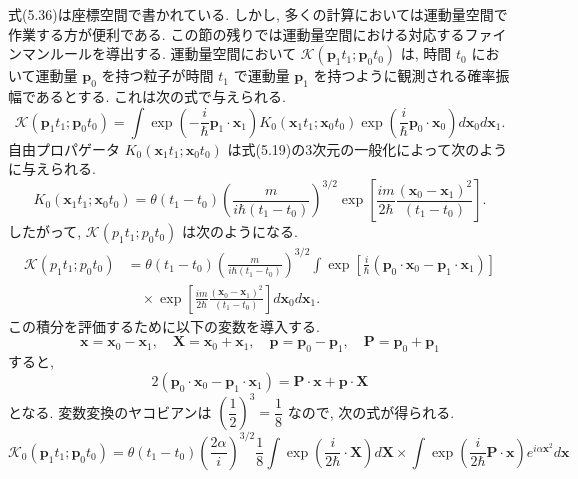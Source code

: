 \documentclass[a4paper,12pt]{article}
\begin{document}
    式(5.36)は座標空間で書かれている. しかし, 多くの計算においては運動量空間で作業する方が便利である. この節の残りでは運動量空間における対応するファインマンルールを導出する. 運動量空間において $\mathcal{K}(\mathbf{p}_1 t_1; \mathbf{p}_0 t_0)$ は, 時間 $t_0$ において運動量 $\mathbf{p}_0$ を持つ粒子が時間 $t_1$ で運動量 $\mathbf{p}_1$ を持つように観測される確率振幅であるとする. これは次の式で与えられる.
\begin{equation*}
        \mathcal{K}(\mathbf{p}_1 t_1; \mathbf{p}_0 t_0) = \int \exp \left( -\frac{i}{\hbar} \mathbf{p}_1 \cdot \mathbf{x}_1 \right) K_0(\mathbf{x}_1 t_1; \mathbf{x}_0 t_0) \exp \left( \frac{i}{\hbar} \mathbf{p}_0 \cdot \mathbf{x}_0 \right) d\mathbf{x}_0 d\mathbf{x}_1. \tag{5.38}
\end{equation*}
自由プロパゲータ $K_0(\mathbf{x}_1 t_1; \mathbf{x}_0 t_0)$ は式(5.19)の3次元の一般化によって次のように与えられる.
\begin{equation*}
    K_0(\mathbf{x}_1 t_1; \mathbf{x}_0 t_0) = \theta(t_1 - t_0) \left( \frac{m}{i\hbar(t_1 - t_0)} \right)^{3/2} \exp \left[ \frac{im}{2\hbar} \frac{(\mathbf{x}_0 - \mathbf{x}_1)^2}{(t_1 - t_0)} \right]. \tag{5.39}
\end{equation*}
したがって, $\mathcal{K}(p_1 t_1; p_0 t_0)$ は次のようになる.
\begin{align*}
    \mathcal{K}(p_1 t_1; p_0 t_0) &= \theta(t_1 - t_0) \left( \frac{m}{i\hbar(t_1 - t_0)} \right)^{3/2} \int \exp\left[ \frac{i}{\hbar}(\mathbf{p}_0 \cdot \mathbf{x}_0 - \mathbf{p}_1 \cdot \mathbf{x}_1) \right]\\
    &\quad \times \exp\left[ \frac{im}{2\hbar} \frac{(\mathbf{x}_0 - \mathbf{x}_1)^2}{(t_1 - t_0)} \right]d\mathbf{x}_0 d\mathbf{x}_1.
\end{align*}
この積分を評価するために以下の変数を導入する.
\begin{equation*}
    \mathbf{x} = \mathbf{x}_0 - \mathbf{x}_1, \quad \mathbf{X} = \mathbf{x}_0 + \mathbf{x}_1, \quad \mathbf{p} = \mathbf{p}_0 - \mathbf{p}_1, \quad \mathbf{P} = \mathbf{p}_0 + \mathbf{p}_1
\end{equation*}
すると, 
\begin{equation*}
    2(\mathbf{p}_0 \cdot \mathbf{x}_0 - \mathbf{p}_1 \cdot \mathbf{x}_1) = \mathbf{P} \cdot \mathbf{x} + \mathbf{p} \cdot \mathbf{X}
\end{equation*}
となる. 変数変換のヤコビアンは $\left( \dfrac{1}{2} \right)^3 = \dfrac{1}{8}$ なので, 次の式が得られる.
\begin{equation*}
    \mathcal{K}_0(\mathbf{p}_1 t_1; \mathbf{p}_0 t_0) = \theta(t_1 - t_0) \left( \frac{2\alpha}{i} \right)^{3/2} \frac{1}{8}\int \exp \left( \frac{i}{2\hbar} \mathbf{} \cdot \mathbf{X} \right)d\mathbf{X} \times  \int \exp \left( \frac{i}{2\hbar} \mathbf{P} \cdot \mathbf{x} \right)e^{i\alpha\mathbf{x}^2}  d\mathbf{x}
\end{equation*}
\end{document}
